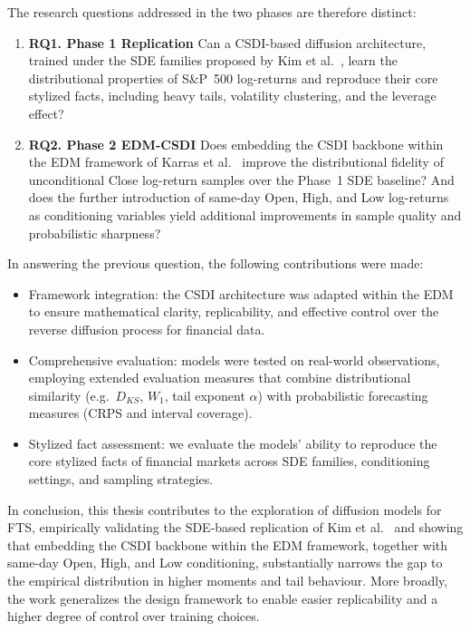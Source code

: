 The research questions addressed in the two phases are therefore distinct:
\begin{enumerate}
    \item \textbf{RQ1. Phase 1 \textemdash{} Replication} \quad Can a CSDI-based diffusion architecture, trained under the SDE families proposed by Kim et al.\ \cite{kim2025diffusion}, learn the distributional properties of S\&P~500 log-returns and reproduce their core stylized facts, including heavy tails, volatility clustering, and the leverage effect?
    \item \textbf{RQ2. Phase 2 \textemdash{} EDM-CSDI} \quad Does embedding the CSDI backbone within the EDM framework of Karras et al.\ \cite{karras2022elucidating} improve the distributional fidelity of unconditional Close log-return samples over the Phase~1 SDE baseline? And does the further introduction of same-day Open, High, and Low log-returns as conditioning variables yield additional improvements in sample quality and probabilistic sharpness?
\end{enumerate}

In answering the previous question, the following contributions were made:
\begin{itemize}
    \item Framework integration: the CSDI architecture was adapted within the EDM to ensure mathematical clarity, replicability, and effective control over the reverse diffusion process for financial data.
    \item Comprehensive evaluation: models were tested on real-world observations, employing extended evaluation measures that combine distributional similarity (e.g.\ $D_{KS}$, $W_1$, tail exponent $\hat{\alpha}$) with probabilistic forecasting measures (CRPS and interval coverage).
    \item Stylized fact assessment: we evaluate the models' ability to reproduce the core stylized facts of financial markets across SDE families, conditioning settings, and sampling strategies.
\end{itemize}

In conclusion, this thesis contributes to the exploration of diffusion models for FTS, empirically validating the SDE-based replication of Kim et al.\ \cite{kim2025diffusion} and showing that embedding the CSDI backbone within the EDM framework, together with same-day Open, High, and Low conditioning, substantially narrows the gap to the empirical distribution in higher moments and tail behaviour. More broadly, the work generalizes the design framework to enable easier replicability and a higher degree of control over training choices.

